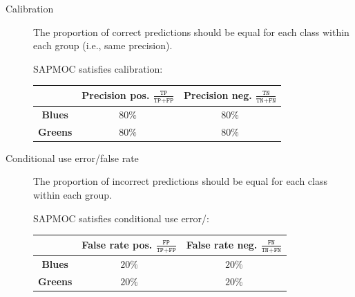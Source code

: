 \begin{description}
\begin{description}
            \item[Calibration] 
                The proportion of correct predictions should be equal for each class within each group (i.e., same precision).
                \begin{example}[SAPMOC]
                    SAPMOC satisfies calibration:
                    \begin{center}
                        \footnotesize
                        \begin{tabular}{c|cc}
                            \toprule
                                & \textbf{Precision pos.} $\frac{\texttt{TP}}{\texttt{TP}+\texttt{FP}}$ 
                                & \textbf{Precision neg.} $\frac{\texttt{TN}}{\texttt{TN}+\texttt{FN}}$ \\
                            \midrule
                                \textbf{Blues} & $80\%$ & $80\%$ \\
                                \textbf{Greens} & $80\%$ & $80\%$ \\
                            \bottomrule
                        \end{tabular}
                    \end{center}
                \end{example}

            \item[Conditional use error/false rate] 
                The proportion of incorrect predictions should be equal for each class within each group.
                \begin{example}[SAPMOC]
                    SAPMOC satisfies conditional use error/:
                    \begin{center}
                        \footnotesize
                        \begin{tabular}{c|cc}
                            \toprule
                                & \textbf{False rate pos.} $\frac{\texttt{FP}}{\texttt{TP}+\texttt{FP}}$ 
                                & \textbf{False rate neg.} $\frac{\texttt{FN}}{\texttt{TN}+\texttt{FN}}$ \\
                            \midrule
                                \textbf{Blues} & $20\%$ & $20\%$ \\
                                \textbf{Greens} & $20\%$ & $20\%$ \\
                            \bottomrule
                        \end{tabular}
                    \end{center}
                \end{example}


\end{description}
\end{description}

